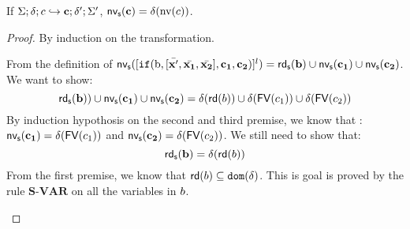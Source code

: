 \documentclass[a4paper,11pt]{article}
\begin{document}
\begin{lem}
\label{lem:fv}
If $\Sigma;\delta ; c \hookrightarrow \mathbf{{c}} ; \delta';\Sigma' $, $\mathsf{nv_s} (\mathbf{{c}}) = \delta(\text{nv}(c))$. 
\end{lem}
\begin{proof}
 By induction on the transformation.
 \begin{itemize}
From the definition of $\mathsf{nv_s} ([\mathtt{if}(\textrm{b}, [\bar{\mathbf{{x'}}}, \bar{\mathbf{{x_1}}}, \bar{\mathbf{{x_2}}}] , \mathbf{{c_1}}, \mathbf{{c_2}})]^l) = \mathsf{rd_s} (\mathbf{{b}}) \cup \mathsf{nv_s} (\mathbf{{c_1}}) \cup \mathsf{nv_s} (\mathbf{{c_2}})$. We want to show: \[\mathsf{rd_s} (\mathbf{{b}})) \cup \mathsf{nv_s} (\mathbf{{c_1}}) \cup \mathsf{nv_s} (\mathbf{{c_2}}) = \delta( \mathsf{rd} (b)) \cup \delta(\mathsf{FV} (c_1)) \cup \delta(\mathsf{FV} (c_2)  )\]
By induction hypothosis on the second and third premise, we know that : $\mathsf{nv_s} (\mathbf{{c_1}}) = \delta(\mathsf{FV} (c_1)) $ and $\mathsf{nv_s} (\mathbf{{c_2}}) = \delta(\mathsf{FV} (c_2)) $.  We still need to show that: 
\[
  \mathsf{rd_s} (\mathbf{{b}}) = \delta(\mathsf{rd} (b))
\] 
From the first premise, we know that $\mathsf{rd} (b) \subseteq \mathtt{dom}(\delta)$. This is goal is proved by the rule $\textbf{S-VAR}$ on all the variables in $b$.\\
\end{itemize}
\end{proof}
\end{document}
